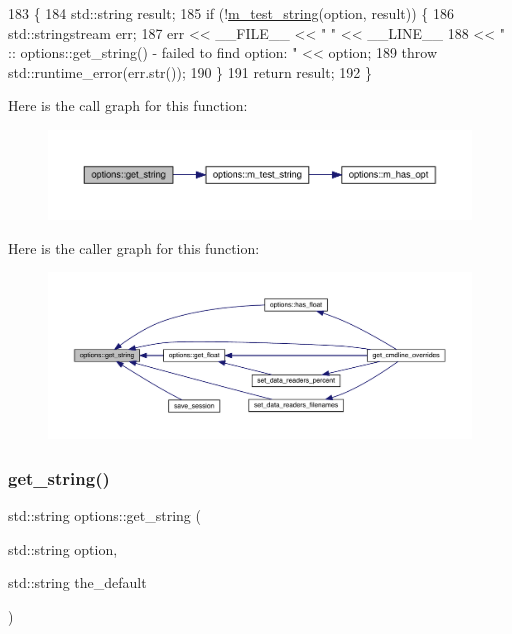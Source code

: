 \begin{DoxyCode}
183 \{
184   std::string result;
185   \textcolor{keywordflow}{if} (!\hyperlink{classoptions_a8286a8617eec86a3d4cf678bd17739ba}{m\_test\_string}(option, result)) \{
186     std::stringstream err;
187     err << \_\_FILE\_\_ << \textcolor{stringliteral}{" "} << \_\_LINE\_\_
188         << \textcolor{stringliteral}{" :: options::get\_string() - failed to find option: "} << option;
189     \textcolor{keywordflow}{throw} std::runtime\_error(err.str());
190   \}
191   \textcolor{keywordflow}{return} result;
192 \}
\end{DoxyCode}
Here is the call graph for this function\+:\nopagebreak
\begin{figure}[H]
\begin{center}
\leavevmode
\includegraphics[width=350pt]{classoptions_aeb84be21a30b0dd41d7d9f3f52c0f3f7_cgraph}
\end{center}
\end{figure}
Here is the caller graph for this function\+:\nopagebreak
\begin{figure}[H]
\begin{center}
\leavevmode
\includegraphics[width=350pt]{classoptions_aeb84be21a30b0dd41d7d9f3f52c0f3f7_icgraph}
\end{center}
\end{figure}
\mbox{\label{classoptions_ae03327a8846e4acb3986b5a6d79b3790}} 
\subsubsection{\texorpdfstring{get\+\_\+string()}{get\_string()}\hspace{0.1cm}{\footnotesize\ttfamily [2/2]}}
{\footnotesize\ttfamily std\+::string options\+::get\+\_\+string (\begin{DoxyParamCaption}\item[{std\+::string}]{option,  }\item[{std\+::string}]{the\+\_\+default }\end{DoxyParamCaption})}



